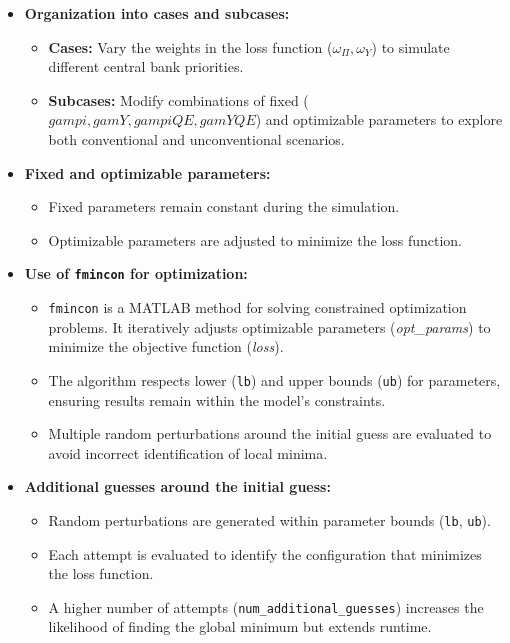 \documentclass[12pt]{article}
\begin{document}
\begin{itemize}
    \item \textbf{Organization into cases and subcases:}
    \begin{itemize}
        \item \textbf{Cases:} Vary the weights in the loss function (\(\omega_\Pi, \omega_Y\)) to simulate different central bank priorities.
        \item \textbf{Subcases:} Modify combinations of fixed (\(gampi, gamY, gampiQE, gamYQE\)) and optimizable parameters to explore both conventional and unconventional scenarios.
    \end{itemize}
    \item \textbf{Fixed and optimizable parameters:}
    \begin{itemize}
        \item Fixed parameters remain constant during the simulation.
        \item Optimizable parameters are adjusted to minimize the loss function.
    \end{itemize}
    \item \textbf{Use of \texttt{fmincon} for optimization:}
    \begin{itemize}
        \item \texttt{fmincon} is a MATLAB method for solving constrained optimization problems. It iteratively adjusts optimizable parameters (\textit{opt\_params}) to minimize the objective function (\textit{loss}).
        \item The algorithm respects lower (\texttt{lb}) and upper bounds (\texttt{ub}) for parameters, ensuring results remain within the model's constraints.
        \item Multiple random perturbations around the initial guess are evaluated to avoid incorrect identification of local minima.
    \end{itemize}
    \item \textbf{Additional guesses around the initial guess:}
    \begin{itemize}
        \item Random perturbations are generated within parameter bounds (\texttt{lb}, \texttt{ub}).
        \item Each attempt is evaluated to identify the configuration that minimizes the loss function.
        \item A higher number of attempts (\texttt{num\_additional\_guesses}) increases the likelihood of finding the global minimum but extends runtime.

\end{itemize}
\end{itemize}
\end{document}

